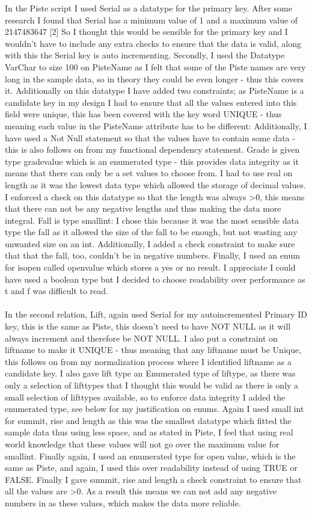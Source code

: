 \documentclass[12pt]{article}
\begin{document}
In the Piste script I used Serial as a datatype for the primary key. After some research I found that Serial has a minimum value of 1 and a maximum value of 2147483647 [2] So I thought this would be sensible for the primary key and I wouldn't have to include any extra checks to ensure that the data is valid, along with this the Serial key is auto incrementing. Secondly, I used the Datatype VarChar to size 100 on PisteName as I felt that some of the Piste names are very long in the sample data, so in theory they could be even longer - thus this covers it. Additionally on this datatype I have added two constraints; as  PisteName is a candidate key in my design I had to ensure that all the values entered into this field were unique, this has been covered with the key word UNIQUE - thus meaning each value in the PisteName attribute has to be different: Additionally, I have used a Not Null statement so that the values have to contain some data - this is also follows on from my functional dependency statement.
Grade is given type gradevalue which is an enumerated type - this provides data integrity as it means that there can only be a set values to choose from. I had to use real on length as it was the lowest data type which allowed the storage of decimal values. I enforced a check on this datatype so that the length was always \textgreater 0, this means that there can not be any negative lengths and thus making the data more integral.
Fall is type smallint: I chose this because it was the most sensible data type the fall as it allowed the size of the fall to be enough, but not wasting any unwanted size on an int. Additionally, I added a check constraint to make sure that that the fall, too, couldn't be in negative numbers.
Finally, I used an enum for isopen called openvalue which stores a yes or no result. I appreciate I could have used a boolean type but I decided to choose readability over performance as t and f was difficult to read.
~\\\\
In the second relation, Lift, again used Serial for my autoincremented Primary ID key, this is the same as Piste, this doesn't need to have NOT NULL as it will always increment and therefore be NOT NULL. I also put a constraint on liftname to make it UNIQUE - thus meaning that any liftname must be Unique, this follows on from my normalization process where I identified liftname as a candidate key. I also gave lift type an Enumerated type of liftype, as there was only a selection of lifttypes that I thought this would be valid as there is only a small selection of lifttypes available, so to enforce data integrity I added the enumerated type, see below for my justification on enums. Again I used small int for summit, rise and length as this was the smallest datatype which fitted the sample data thus using less space, and as stated in Piste, I feel that using real world knowledge that these values will not go over the maximum value for smallint. Finally again, I used an enumerated type for open value, which is the same as Piste, and again, I used this over readability instead of using TRUE or FALSE. Finally I gave summit, rise and length a check constraint to ensure that all the values are \textgreater 0. As a result this means we can not add any negative numbers in as these values, which makes the data more reliable.
\end{document}

